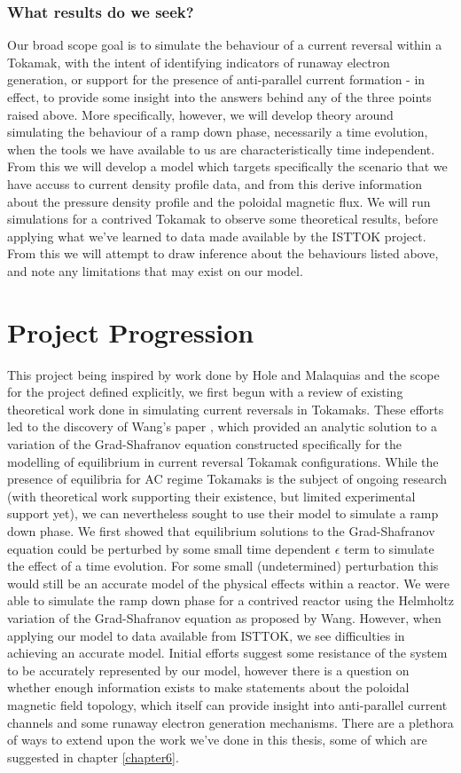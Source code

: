\subsubsection{What results do we seek?}
Our broad scope goal is to simulate the behaviour of a current reversal within a Tokamak, with the intent 
of identifying indicators of runaway electron generation, or support for the presence of anti-parallel current formation
- in effect, to provide some insight into the answers behind any of the three points raised above. 
More specifically, however, we will develop theory around simulating the behaviour of a ramp down phase, necessarily a time evolution, when 
the tools we have available to us are characteristically time independent. From this we will develop a model 
which targets specifically the scenario that we have accuss to current density profile data, and from this 
derive information about the pressure density profile and the poloidal magnetic flux. We will run simulations 
for a contrived Tokamak to observe some theoretical results, before applying what we've learned to data 
made available by the ISTTOK project. From this we will attempt to draw inference about the behaviours listed 
above, and note any limitations that may exist on our model.

\section{Project Progression}

This project being inspired by work done by Hole and Malaquias and the scope for the project defined explicitly, 
we first begun with a review of existing theoretical work done in simulating current reversals in Tokamaks. These 
efforts led to the discovery of Wang's paper \cite{wang-analytic-solution}, which provided an analytic solution 
to a variation of the Grad-Shafranov equation constructed specifically for the modelling of equilibrium in 
current reversal Tokamak configurations. While the presence of equilibria for AC regime Tokamaks is the subject of 
ongoing research (with theoretical work supporting their existence, but limited experimental support yet), 
we can nevertheless sought to use their model to simulate a ramp down phase. We first showed that equilibrium 
solutions to the Grad-Shafranov equation could be perturbed by some small time dependent $\epsilon$ term to 
simulate the effect of a time evolution. For some small (undetermined) perturbation this would still be an accurate 
model of the physical effects within a reactor. We were able to simulate the ramp down phase for a contrived reactor using 
the Helmholtz variation of the Grad-Shafranov equation as proposed by Wang. However, when applying our model to 
data available from ISTTOK, we see difficulties in achieving an accurate model. Initial efforts suggest some resistance 
of the system to be accurately represented by our model, however there is a question on whether enough 
information exists to make statements about the poloidal magnetic field topology, which itself can provide 
insight into anti-parallel current channels and some runaway electron generation mechanisms. There are a 
plethora of ways to extend upon the work we've done in this thesis, some of which are suggested in chapter \ref{chapter6}.
